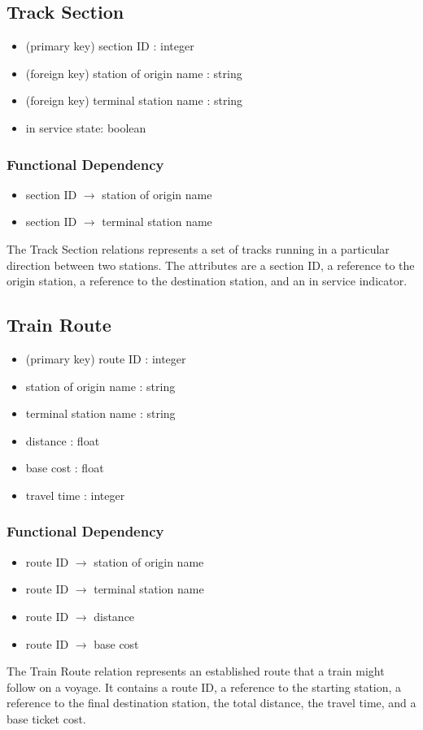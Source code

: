\documentclass[a4paper]{article}
\begin{document}
\subsection*{Track Section}
\begin{itemize}
\item (primary key) section ID : integer
\item (foreign key) station of origin name : string
\item (foreign key) terminal station name : string
\item in service state: boolean
\end{itemize}
\subsubsection*{Functional Dependency}
\begin{itemize}
\item section ID $\rightarrow$ station of origin name 
\item section ID $\rightarrow$ terminal station name
\end{itemize}
The Track Section relations represents a set of tracks running in a particular direction between two stations. The attributes are a section ID, a reference to the origin station, a reference to the destination station, and an in service indicator.

\subsection*{Train Route}
\begin{itemize}
\item (primary key) route ID : integer
\item station of origin name : string
\item terminal station name : string
\item distance : float
\item base cost : float
\item travel time : integer 
\end{itemize}
\subsubsection*{Functional Dependency}
\begin{itemize}
\item route ID $\rightarrow$ station of origin name
\item route ID $\rightarrow$ terminal station name
\item route ID $\rightarrow$ distance
\item route ID $\rightarrow$ base cost
\end{itemize}
The Train Route relation represents an established route that a train might follow on a voyage. It contains a route ID, a reference to the starting station, a reference to the final destination station, the total distance, the travel time, and a base ticket cost.
\end{document}
